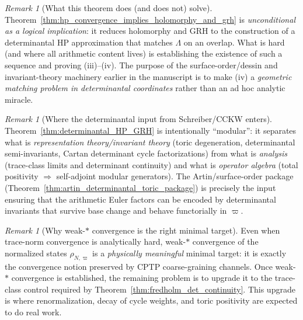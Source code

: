 \documentclass[11pt,oneside]{amsbook}
\numberwithin{equation}{section}
\theoremstyle{plain}
\theoremstyle{definition}
\theoremstyle{remark}
\newtheorem{remark}[theorem]{Remark}
\begin{document}
\begin{remark}[What this theorem does (and does not) solve]
Theorem~\ref{thm:hp_convergence_implies_holomorphy_and_grh} is \emph{unconditional as a logical implication}:
it reduces holomorphy and GRH to the construction of a determinantal HP approximation that matches $\Lambda$ on an overlap.
What is hard (and where all arithmetic content lives) is establishing the existence of such a sequence and proving (iii)--(iv).
The purpose of the surface-order/dessin and invariant-theory machinery earlier in the manuscript is to make (iv) a \emph{geometric matching problem in determinantal coordinates} rather than an ad hoc analytic miracle.
\end{remark}




\begin{remark}[Where the determinantal input from Schreiber/CCKW enters]
Theorem~\ref{thm:determinantal_HP_GRH} is intentionally ``modular'':
it separates what is \emph{representation theory/invariant theory} (toric degeneration, determinantal semi-invariants, Cartan determinant cycle factorizations) from what is \emph{analysis} (trace-class limits and determinant continuity) and what is \emph{operator algebra} (total positivity $\Rightarrow$ self-adjoint modular generators).
The Artin/surface-order package (Theorem~\ref{thm:artin_determinantal_toric_package}) is precisely the input ensuring that the arithmetic Euler factors can be encoded by determinantal invariants that survive base change and behave functorially in $\varpi$.
\end{remark}

\begin{remark}[Why weak-$\ast$ convergence is the right minimal target]
Even when trace-norm convergence is analytically hard, weak-$\ast$ convergence of the normalized states $\rho_{N,\varpi}$ is a \emph{physically meaningful} minimal target:
it is exactly the convergence notion preserved by CPTP coarse-graining channels.
Once weak-$\ast$ convergence is established, the remaining problem is to upgrade it to the trace-class control required by Theorem~\ref{thm:fredholm_det_continuity}.
This upgrade is where renormalization, decay of cycle weights, and toric positivity are expected to do real work.
\end{remark}




\end{document}
